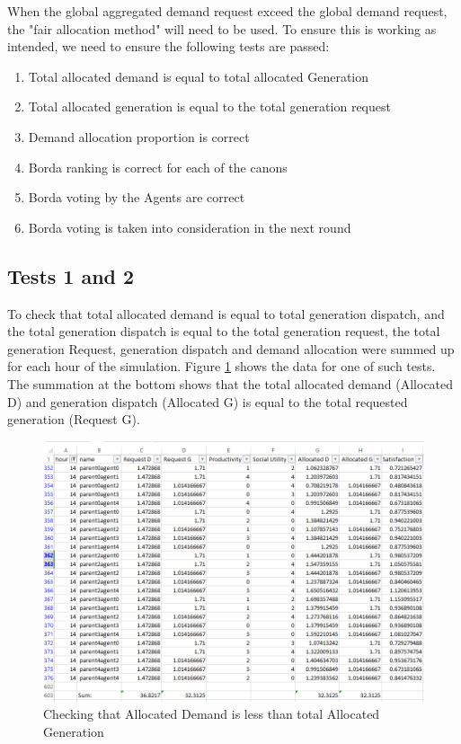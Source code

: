 When the global aggregated demand request exceed the global demand request, the "fair allocation method" will need to be used. To ensure this is working as intended, we need to ensure the following tests are passed:

\begin{enumerate}
	\item Total allocated demand is equal to total allocated Generation
	\item Total allocated generation is equal to the total generation request
	\item Demand allocation proportion is correct
	\item Borda ranking is correct for each of the canons
	\item Borda voting by the Agents are correct
	\item Borda voting is taken into consideration in the next round
\end{enumerate}

\subsection*{Tests 1 and 2}
To check that total allocated demand is equal to total generation dispatch, and the total generation dispatch is equal to the total generation request, the total generation Request, generation dispatch and demand allocation were summed up for each hour of the simulation.  Figure \ref{fig:test3} shows the data for one of such tests. The summation at the bottom shows that the total allocated demand (Allocated D) and generation dispatch (Allocated G) is equal to the total requested generation (Request G).

\begin{figure}[h!]
	\centering
	\includegraphics[scale=0.4]{Images/test-allocation2.png}
	\caption{Checking that Allocated Demand is less than total Allocated Generation}
	\label{fig:test3}
\end{figure}

